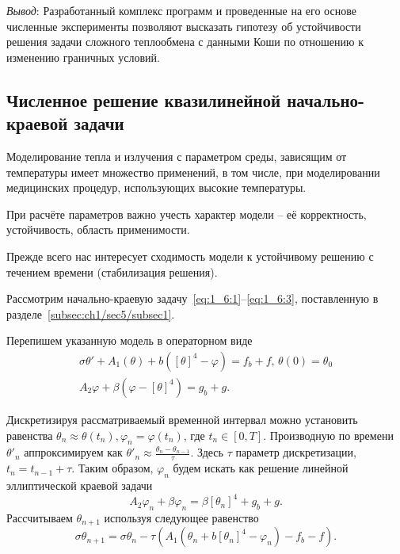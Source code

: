 \textit{Вывод}: Разработанный комплекс программ и проведенные на его
основе численные эксперименты позволяют высказать
гипотезу об устойчивости решения задачи сложного теплообмена
с данными Коши по отношению к изменению граничных условий.

%

\subsection{Численное решение квазилинейной начально-краевой задачи}
\label{subsec:ch4/sec3/quasilinear}
Моделирование тепла и излучения с параметром среды, зависящим от температуры
имеет множество применений, в том числе, при моделировании медицинских процедур,
использующих высокие температуры.

При расчёте параметров важно учесть характер модели -- её корректность, устойчивость,
область применимости.

Прежде всего нас интересует сходимость модели к устойчивому
решению с течением времени (стабилизация решения).

Рассмотрим начально-краевую задачу~\eqref{eq:1_6:1}--\eqref{eq:1_6:3},
поставленную в разделе~\ref{subsec:ch1/sec5/subsec1}.

Перепишем указанную модель в операторном виде
\begin{equation}
    \label{eq:4_3:nonst_op}
    \begin{gathered}
        \sigma \theta' + A_1(\theta) + b([\theta]^4 - \varphi) = f_b + f, \, \theta(0) = \theta_0 \\
        A_2\varphi + \beta(\varphi - [\theta]^4) = g_b + g.
    \end{gathered}
\end{equation}

Дискретизируя рассматриваемый временной интервал можно установить равенства
$\theta_n \approx \theta(t_n), \varphi_n = \varphi(t_n)$, где $t_n \in [0, T]$.
Производную по времени $\theta'_n$ аппроксимируем как
$\theta'_{n} \approx \frac{\theta_{n} - \theta_{n-1}}{\tau}$.
Здесь $\tau$ параметр дискретизации, $t_n = t_{n-1} + \tau$.
Таким образом, $\varphi_n$ будем искать как решение линейной эллиптической краевой задачи
\[
    A_2 \varphi_n + \beta \varphi_n = \beta [\theta_n]^4 + g_b + g.
\]
Рассчитываем $\theta_{n+1}$ используя следующее равенство
\begin{equation}
    \label{eq:4_3:theta_progress}
    \sigma \theta_{n+1} = \sigma \theta_n - \tau (A_1(\theta_n + b[\theta_n]^4 - \varphi_n) - f_b -f).
\end{equation}

